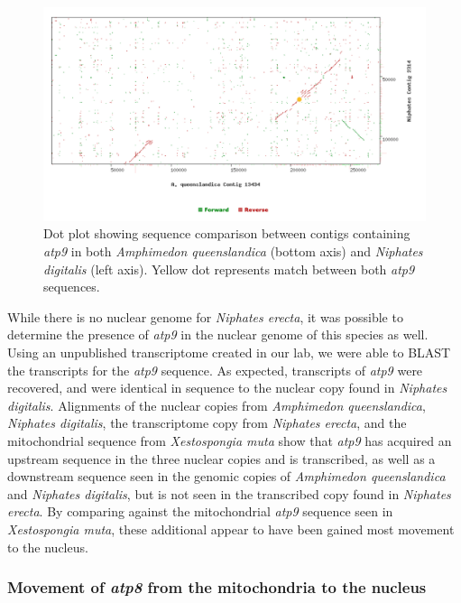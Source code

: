 \documentclass[../main.tex]{subfiles}
\begin{document}
\begin{figure}[htp]
    \centering
    \includegraphics[width=1.0\textwidth]{Figures/figure 3.png}
    \caption{Dot plot showing sequence comparison between contigs containing \emph{atp9} in both \emph{Amphimedon queenslandica} (bottom axis) and \emph{Niphates digitalis} (left axis). Yellow dot represents match between both \emph{atp9} sequences.}
\end{figure}

While there is no nuclear genome for \emph{Niphates erecta}, it was possible to determine the presence of \emph{atp9} in the nuclear genome of this species as well. Using an unpublished transcriptome created in our lab, we were able to BLAST the transcripts for the \emph{atp9} sequence. As expected, transcripts of \emph{atp9} were recovered, and were identical in sequence to the nuclear copy found in \emph{Niphates digitalis}. Alignments of the nuclear copies from \emph{Amphimedon queenslandica}, \emph{Niphates digitalis}, the transcriptome copy from \emph{Niphates erecta}, and the mitochondrial sequence from \emph{Xestospongia muta} show that \emph{atp9} has acquired an upstream sequence in the three nuclear copies and is transcribed, as well as a downstream sequence seen in the genomic copies of \emph{Amphimedon queenslandica} and \emph{Niphates digitalis}, but is not seen in the transcribed copy found in \emph{Niphates erecta}. By comparing against the mitochondrial \emph{atp9} sequence seen in \emph{Xestospongia muta}, these additional appear to have been gained most movement to the nucleus.

\subsubsection{Movement of \emph{atp8} from the mitochondria to the nucleus}
\end{document}
